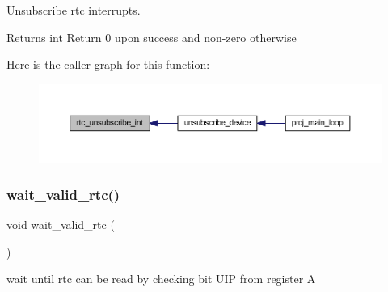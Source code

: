 Unsubscribe rtc interrupts. 

\begin{DoxyReturn}{Returns}
int Return 0 upon success and non-\/zero otherwise 
\end{DoxyReturn}
Here is the caller graph for this function\+:\nopagebreak
\begin{figure}[H]
\begin{center}
\leavevmode
\includegraphics[width=350pt]{group__rtc_gab8f17bf5280c908c8b199a90fefcc758_icgraph}
\end{center}
\end{figure}
\mbox{\label{group__rtc_ga74509feeac5ce275416f0239f4d92776}} 
\subsubsection{\texorpdfstring{wait\+\_\+valid\+\_\+rtc()}{wait\_valid\_rtc()}}
{\footnotesize\ttfamily void wait\+\_\+valid\+\_\+rtc (\begin{DoxyParamCaption}{ }\end{DoxyParamCaption})}



wait until rtc can be read by checking bit U\+IP from register A 

